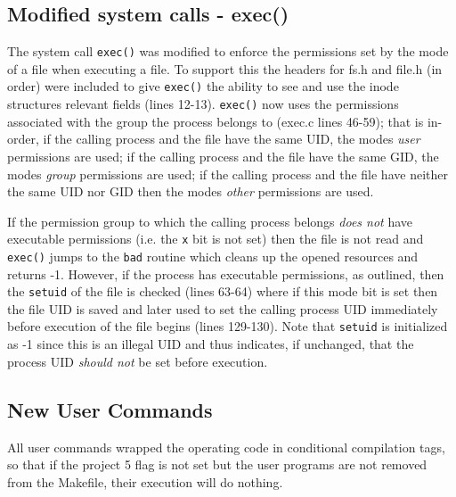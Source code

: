 \documentclass[11pt,letterpaper]{report}
\begin{document}
	\subsection*{Modified system calls - exec()}
	The system call {\tt exec()} was modified to enforce the permissions set by the mode of a file when executing a file. To support this the headers for fs.h and file.h (in order) were included to give {\tt exec()} the ability to see and use
	the inode structures relevant fields (lines 12-13). {\tt exec()} now uses the permissions associated with the group the process belongs to (exec.c lines 46-59); that is in-order, if the calling process and the file have the same UID, 
	the modes \emph{user} permissions are used;
	if the calling process and the file have the same GID, the modes \emph{group} permissions are used; if the calling process and the file have neither the same UID nor GID then the modes \emph{other} permissions are used. 
	
	If the permission group to 
	which the calling process belongs \emph{does not} have executable permissions (i.e. the {\tt x} bit is not set) then the file is not read and {\tt exec()} jumps to the {\tt bad} routine which cleans up the opened resources and returns -1. However, 
	if the process has executable permissions, as outlined, then the {\tt setuid} of the file is checked (lines 63-64) where if this mode bit is set then the file UID is saved and later used to set the calling process UID immediately before execution of the file begins
	(lines 129-130). Note that {\tt setuid} is initialized as -1 since this is an illegal UID and thus indicates, if unchanged, that the process UID \emph{should not} be set before execution.
	
	\subsection*{New User Commands}
	All user commands wrapped the operating code in conditional compilation tags, so that if the project 5 flag is not set but the user programs are not removed from the Makefile, their execution will do nothing.
	
\end{document}
